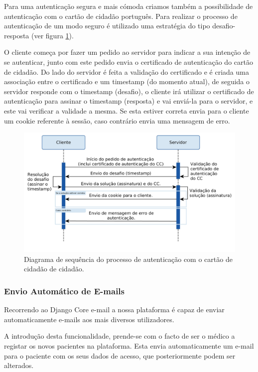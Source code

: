 \documentclass{TTUPhD}
\begin{document}
Para uma autenticação segura e mais cómoda criamos também a possibilidade de autenticação com o cartão de cidadão português.
Para realizar o processo de autenticação de um modo seguro é utilizado uma estratégia do tipo desafio-resposta (ver figura \ref{fig:auth_diagram}).

O cliente começa por fazer um pedido ao servidor para indicar a sua intenção de se autenticar, junto com este pedido envia o certificado de autenticação
do cartão de cidadão. Do lado do servidor é feita a validação do certificado e é criada uma associação entre o certificado e um timestamp (do momento atual),
de seguida o servidor responde com o timestamp (desafio), o cliente irá utilizar o certificado de autenticação para assinar o timestamp (resposta)
e vai enviá-la para o servidor, e este vai verificar a validade a mesma. Se esta estiver correta envia para o cliente um cookie referente à sessão, caso contrário envia
uma mensagem de erro.

\begin{figure}[h!]
    \center
    \includegraphics[scale=0.3]{./img/authentication.jpg}
    \caption{Diagrama de sequência do processo de autenticação com o cartão de cidadão de cidadão.}
    \label{fig:auth_diagram}
\end{figure}

\subsubsection{Envio Automático de E-mails}

Recorrendo ao Django Core e-mail a nossa plataforma é capaz de enviar automaticamente e-mails aos mais diversos utilizadores.

A introdução desta funcionalidade, prende-se com o facto de ser o médico a registar os novos pacientes na plataforma. Esta envia automaticamente um e-mail para o paciente com os seus dados de acesso, que posteriormente podem ser alterados.
\end{document}
